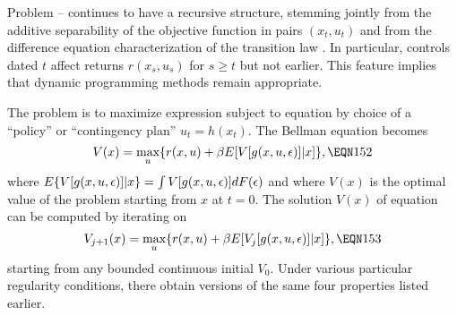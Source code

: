 Problem -- continues to have a recursive structure,
stemming
jointly from the additive separability of the objective function  in
pairs  $(x_t,u_t)$ and from the difference equation characterization of the
transition law .  In particular, controls dated $t$ affect returns
$r(x_s,u_s)$ for $s\ge t$ but not earlier.  This feature implies that dynamic
programming methods remain appropriate.

The problem is to maximize expression
 subject to equation  by choice of a
``policy''
or ``contingency plan'' $u_t=h(x_t)$.  The  Bellman
equation  %
becomes
$$V(x)=\max_u \{r(x,u) +\be E[V[g(x,u,\eps)]|x]\},\EQN 152$$
where $E\{V[g(x,u,{\epsilon})]|x\}=\int V[g(x,u,{\epsilon})]dF({\epsilon})$ and where $V(x)$ is
the optimal value of the problem starting from $x$ at $t=0$.  The solution
$V(x)$ of equation  can be computed by iterating on
$$V_{j+1} (x)=\max_u \{r(x,u)+\be E[V_j[g(x,u,\eps)]|x]\},\EQN 153$$
starting from any bounded continuous initial $V_0$.  Under various
particular regularity conditions, there obtain versions of the same
four properties listed earlier.

    

